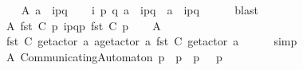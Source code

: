 \begin{isabellebody}
\isanewline
\ \ \isamarkupfalse%
\ A{}{\isacharcolon}{\kern0pt}\ {\isachardoublequoteopen}a\ {\isacharequal}{\kern0pt}\ {\isacharbang}{\kern0pt}{\isasymlangle}{\isacharparenleft}{\kern0pt}i\isactrlbsup p{\isasymrightarrow}q\isactrlesup {\isacharparenright}{\kern0pt}{\isasymrangle}{\isachardoublequoteclose}\isanewline
\ \ \isamarkupfalse%
\ {\isachardoublequoteopen}{\isasymexists}i\ p\ q{\isachardot}{\kern0pt}\ a\ {\isacharequal}{\kern0pt}\ {\isacharbang}{\kern0pt}{\isasymlangle}{\isacharparenleft}{\kern0pt}i\isactrlbsup p{\isasymrightarrow}q\isactrlesup {\isacharparenright}{\kern0pt}{\isasymrangle}\ {\isasymor}\ a\ {\isacharequal}{\kern0pt}\ {\isacharquery}{\kern0pt}{\isasymlangle}{\isacharparenleft}{\kern0pt}i\isactrlbsup p{\isasymrightarrow}q\isactrlesup {\isacharparenright}{\kern0pt}{\isasymrangle}{\isachardoublequoteclose}\isanewline
\ \ \ \ \isamarkupfalse%
\ blast\isanewline
\ \ \isamarkupfalse%
\ A{}{\isacharcolon}{\kern0pt}\ {\isachardoublequoteopen}fst\ {\isacharparenleft}{\kern0pt}C{}\ p{\isacharparenright}{\kern0pt}\ {\isasymmidarrow}{\isacharbang}{\kern0pt}{\isasymlangle}{\isacharparenleft}{\kern0pt}i\isactrlbsup p{\isasymrightarrow}q\isactrlesup {\isacharparenright}{\kern0pt}{\isasymrangle}{\isasymrightarrow}p\ {\isacharparenleft}{\kern0pt}fst\ {\isacharparenleft}{\kern0pt}C{}\ p{\isacharparenright}{\kern0pt}{\isacharparenright}{\kern0pt}{\isachardoublequoteclose}\isanewline
\ \ \isamarkupfalse%
\ A{}\ \isamarkupfalse%
\ {\isachardoublequoteopen}fst\ {\isacharparenleft}{\kern0pt}C{}\ {\isacharparenleft}{\kern0pt}get{\isacharunderscore}{\kern0pt}actor\ a{\isacharparenright}{\kern0pt}{\isacharparenright}{\kern0pt}\ {\isasymmidarrow}a{\isasymrightarrow}{\isacharparenleft}{\kern0pt}get{\isacharunderscore}{\kern0pt}actor\ a{\isacharparenright}{\kern0pt}\ {\isacharparenleft}{\kern0pt}fst\ {\isacharparenleft}{\kern0pt}C{}\ {\isacharparenleft}{\kern0pt}get{\isacharunderscore}{\kern0pt}actor\ a{\isacharparenright}{\kern0pt}{\isacharparenright}{\kern0pt}{\isacharparenright}{\kern0pt}{\isachardoublequoteclose}\isanewline
\ \ \ \ \isamarkupfalse%
\ simp\isanewline
\ \ \isamarkupfalse%
\ A{}{\isacharcolon}{\kern0pt}\ {\isachardoublequoteopen}CommunicatingAutomaton\ p\ {\isacharparenleft}{\kern0pt}{\isasymS}\ p{\isacharparenright}{\kern0pt}\ {\isacharparenleft}{\kern0pt}{\isasymI}\ p{\isacharparenright}{\kern0pt}\ {\isasymM}\ {\isacharparenleft}{\kern0pt}{\isasymR}\ p{\isacharparenright}{\kern0pt}{\isachardoublequoteclose}\isanewline

\end{isabellebody}
